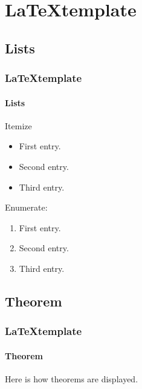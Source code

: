 
\section{\LaTeX template}

\subsection{Lists}
\begin{frame}
  \frametitle{\LaTeX template}
  \framesubtitle{Lists}

  Itemize

  \begin{itemize}
    \item First entry.
    \item Second entry.
    \item Third entry.
  \end{itemize}

  Enumerate:

  \begin{enumerate}
    \item First entry.
    \item Second entry.
    \item Third entry.
  \end{enumerate}
\end{frame}

\subsection{Theorem}
\begin{frame}
  \frametitle{\LaTeX template}
  \framesubtitle{Theorem}

  \begin{theorem}[Example]
    Here is how theorems are displayed.
  \end{theorem}
\end{frame}

